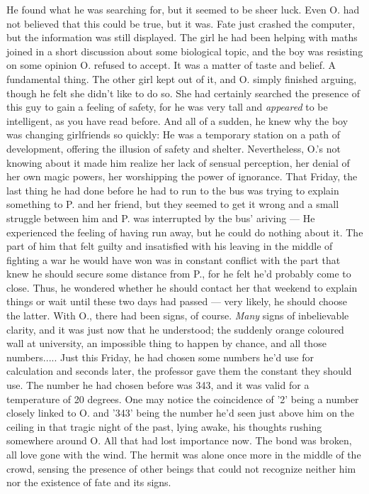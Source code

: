 He found what he was searching for, but it seemed to be sheer luck. Even O. had not believed that this could be true, but it was. Fate just crashed the computer, but the information was still displayed. 
The girl he had been helping with maths joined in a short discussion about some biological topic, and the boy was resisting on some opinion O. refused to accept. 
It was a matter of taste and belief. 
A fundamental thing. 
The other girl kept out of it, and O. simply finished arguing, though he felt she didn't like to do so. She had certainly searched the presence of this guy to gain a feeling of safety, for he was very tall and \emph{appeared} to be intelligent, as you have read before. And all of a sudden, he knew why the boy was changing girlfriends so quickly: He was a temporary station on a path of development, offering the illusion of safety and shelter. 
Nevertheless, O.'s not knowing about it made him realize her lack of sensual perception, her denial of her own magic powers, her worshipping the power of ignorance. 
That Friday, the last thing he had done before he had to run to the bus was trying to explain something to P. and her friend, but they seemed to get it wrong and a small struggle between him and P. was interrupted by the bus' ariving --- He experienced the feeling of having run away, but he could do nothing about it. The part of him that felt guilty and insatisfied with his leaving in the middle of fighting a war he would have won was in constant conflict with the part that knew he should secure some distance from P., for he felt he'd probably come to close. Thus, he wondered whether he should contact her that weekend to explain things or wait until these two days had passed --- very likely, he should choose the latter. 
With O., there had been signs, of course. \emph{Many} signs of inbelievable clarity, and it was just now that he understood; the suddenly orange coloured wall at university, an impossible thing to happen by chance, and all those numbers..... 
Just this Friday, he had chosen some numbers he'd use for calculation and seconds later, the professor gave them the constant they should use. The number he had chosen before was 343, and it was valid for a temperature of 20 degrees. One may notice the coincidence of '2' being a number closely linked to O. and '343' being the number he'd seen just above him on the ceiling in that tragic night of the past, lying awake, his thoughts rushing somewhere around O. 
All that had lost importance now. The bond was broken, all love gone with the wind. 
The hermit was alone once more in the middle of the crowd, sensing the presence of other beings that could not recognize neither him nor the existence of fate and its signs. 
